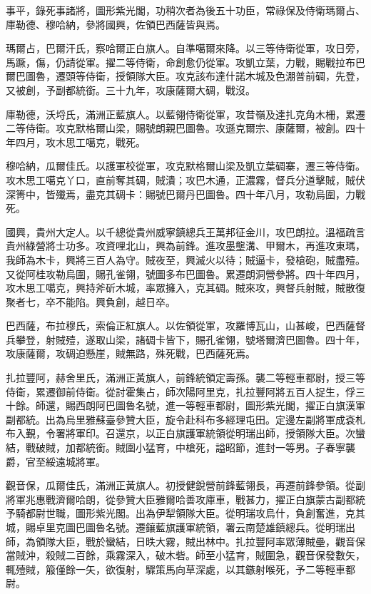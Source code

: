 \begin{pinyinscope}
事平，錄死事諸將，圖形紫光閣，功稍次者為後五十功臣，常祿保及侍衛瑪爾占、庫勒德、穆哈納，參將國興，佐領巴西薩皆與焉。

瑪爾占，巴爾汗氏，察哈爾正白旗人。自準噶爾來降。以三等侍衛從軍，攻日旁，馬蹶，傷，仍請從軍。擢二等侍衛，命創愈仍從軍。攻凱立葉，力戰，賜戰拉布巴爾巴圖魯，遷頭等侍衛，授領隊大臣。攻克該布達什諾木城及色淜普前碉，先登，又被創，予副都統銜。三十九年，攻康薩爾大碉，戰沒。

庫勒德，沃埒氏，滿洲正藍旗人。以藍翎侍衛從軍，攻昔嶺及達扎克角木柵，累遷二等侍衛。攻克默格爾山梁，賜號朗親巴圖魯。攻遜克爾宗、康薩爾，被創。四十年四月，攻木思工噶克，戰死。

穆哈納，瓜爾佳氏。以護軍校從軍，攻克默格爾山梁及凱立葉碉寨，遷三等侍衛。攻木思工噶克丫口，直前奪其碉，賊潰；攻巴木通，正濃霧，督兵分道擊賊，賊伏深箐中，皆殲焉，盡克其碉卡：賜號巴爾丹巴圖魯。四十年八月，攻勒烏圍，力戰死。

國興，貴州大定人。以千總從貴州威寧鎮總兵王萬邦征金川，攻巴朗拉。溫福疏言貴州綠營將士功多。攻資哩北山，興為前鋒。進攻墨壟溝、甲爾木，再進攻東瑪，我師為木卡，興將三百人為守。賊夜至，興滅火以待；賊逼卡，發槍砲，賊盡殪。又從阿桂攻勒烏圍，賜孔雀翎，號圖多布巴圖魯。累遷朗洞營參將。四十年四月，攻木思工噶克，興持斧斫木城，率眾擁入，克其碉。賊來攻，興督兵射賊，賊散復聚者七，卒不能陷。興負創，越日卒。

巴西薩，布拉穆氏，索倫正紅旗人。以佐領從軍，攻羅博瓦山，山甚峻，巴西薩督兵攀登，射賊殪，遂取山梁，諸碉卡皆下，賜孔雀翎，號塔爾濟巴圖魯。四十年，攻康薩爾，攻碉迫懸崖，賊無路，殊死戰，巴西薩死焉。

扎拉豐阿，赫舍里氏，滿洲正黃旗人，前鋒統領定壽孫。襲二等輕車都尉，授三等侍衛，累遷御前侍衛。從討霍集占，師次陽阿里克，扎拉豐阿將五百人捉生，俘三十餘。師還，賜西朗阿巴圖魯名號，進一等輕車都尉，圖形紫光閣，擢正白旗漢軍副都統。出為烏里雅蘇臺參贊大臣，旋令赴科布多經理屯田。定邊左副將軍成袞札布入覲，令署將軍印。召還京，以正白旗護軍統領從明瑞出師，授領隊大臣。次蠻結，戰破賊，加都統銜。賊圍小猛育，中槍死，謚昭節，進封一等男。子春寧襲爵，官至綏遠城將軍。

觀音保，瓜爾佳氏，滿洲正黃旗人。初授健銳營前鋒藍翎長，再遷前鋒參領。從副將軍兆惠戰濟爾哈朗，從參贊大臣雅爾哈善攻庫車，戰甚力，擢正白旗蒙古副都統予騎都尉世職，圖形紫光閣。出為伊犁領隊大臣。從明瑞攻烏什，負創奮進，克其城，賜卓里克圖巴圖魯名號。遷鑲藍旗護軍統領，署云南楚雄鎮總兵。從明瑞出師，為領隊大臣，戰於蠻結，日昳大霧，賊出林中。扎拉豐阿率眾薄賊壘，觀音保當賊沖，殺賊二百餘，乘霧深入，破木砦。師至小猛育，賊圍急，觀音保發數矢，輒殪賊，箙僅餘一矢，欲復射，驟策馬向草深處，以其鏃射喉死，予二等輕車都尉。


\end{pinyinscope}
